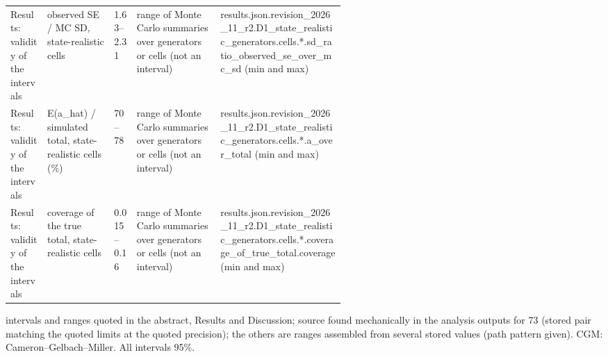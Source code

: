 \begin{table}[!tbp]
\begin{tabularx}{\linewidth}{@{}p{0.11\linewidth}p{0.2\linewidth}lp{0.25\linewidth}X@{}}
Results: validity of the intervals & observed SE / MC SD, state-realistic cells & 1.63--2.31 & range of Monte Carlo summaries over generators or cells (not an interval) & {\ttfamily\tiny results.\allowbreak{}json.\allowbreak{}revision\_2026\_11\_r2.\allowbreak{}D1\_state\_realistic\_generators.\allowbreak{}cells.\allowbreak{}*.\allowbreak{}sd\_ratio\_observed\_se\_over\_mc\_sd (min and max)} \\
Results: validity of the intervals & E(a\_hat) / simulated total, state-realistic cells (\%) & 70--78 & range of Monte Carlo summaries over generators or cells (not an interval) & {\ttfamily\tiny results.\allowbreak{}json.\allowbreak{}revision\_2026\_11\_r2.\allowbreak{}D1\_state\_realistic\_generators.\allowbreak{}cells.\allowbreak{}*.\allowbreak{}a\_over\_total (min and max)} \\
Results: validity of the intervals & coverage of the true total, state-realistic cells & 0.015--0.16 & range of Monte Carlo summaries over generators or cells (not an interval) & {\ttfamily\tiny results.\allowbreak{}json.\allowbreak{}revision\_2026\_11\_r2.\allowbreak{}D1\_state\_realistic\_generators.\allowbreak{}cells.\allowbreak{}*.\allowbreak{}coverage\_of\_true\_total.\allowbreak{}coverage (min and max)} \\
\bottomrule
\end{tabularx}
\par\smallskip\parbox{\linewidth}{\scriptsize\linespread{1.15} intervals and ranges quoted in the abstract, Results and Discussion; source found mechanically in the analysis outputs for 73 (stored pair matching the quoted limits at the quoted precision); the others are ranges assembled from several stored values (path pattern given). CGM: Cameron--Gelbach--Miller. All intervals 95\%.}
\end{table}
